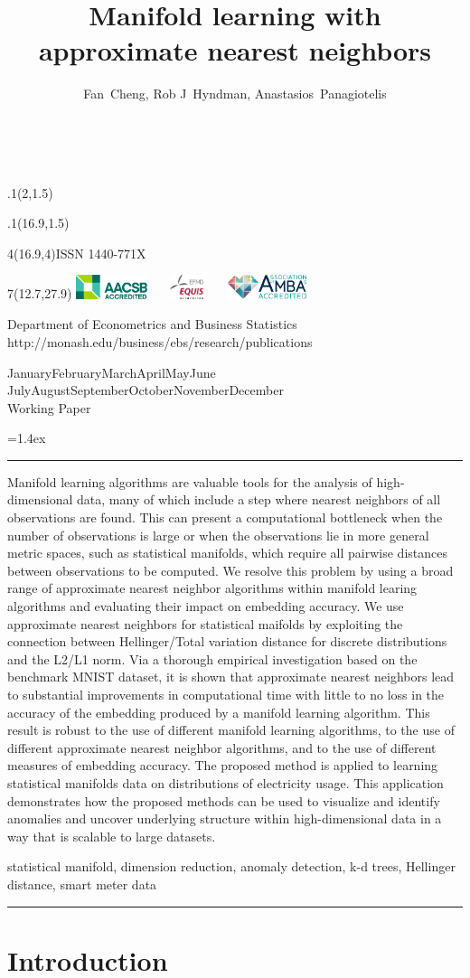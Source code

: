 \documentclass[11pt,a4paper,]{article}
\title{Manifold learning with approximate nearest neighbors}
\author{Fan~Cheng, Rob J~Hyndman, Anastasios~Panagiotelis}
\date{\sf\Date~\Month~\Year}
\makeatletter
\def\Date{\number\day}
\def\Month{\ifcase\month\or
 January\or February\or March\or April\or May\or June\or
 July\or August\or September\or October\or November\or December\fi}
\def\Year{\number\year}
\def\showjel{{\large\textsf{\textbf{JEL classification:}}~\@jel}}
\def\cover{{\sffamily\setcounter{page}{0}
        \thispagestyle{empty}
        \placefig{2}{1.5}{width=5cm}{monash2}
        \placefig{16.9}{1.5}{width=2.1cm}{MBusSchool}
        \begin{textblock}{4}(16.9,4)ISSN 1440-771X\end{textblock}
        \begin{textblock}{7}(12.7,27.9)\hfill
        \includegraphics[height=0.7cm]{AACSB}~~~
        \includegraphics[height=0.7cm]{EQUIS}~~~
        \includegraphics[height=0.7cm]{AMBA}
        \end{textblock}
        \vspace*{2cm}
        \begin{center}\Large
        Department of Econometrics and Business Statistics\\[.5cm]
        \footnotesize http://monash.edu/business/ebs/research/publications
        \end{center}\vspace{2cm}
        \begin{center}
        \fbox{\parbox{14cm}{\begin{onehalfspace}\centering\Huge\vspace*{0.3cm}
                \textsf{\textbf{\expandafter{\@title}}}\vspace{1cm}\par
                \LARGE\@author\end{onehalfspace}
        }}
        \end{center}
        \vfill
                \begin{center}\Large
                \Month~\Year\\[1cm]
                Working Paper \@wp
        \end{center}\vspace*{2cm}}}
\def\pageone{{\sffamily\setstretch{1}%
        \thispagestyle{empty}%
        \vbox to \textheight{%
        \raggedright\baselineskip=1.2cm
     {\fontsize{24.88}{30}\sffamily\textbf{\expandafter{\@title}}}
        \vspace{2cm}\par
        \hspace{1cm}\parbox{14cm}{\sffamily\large\@addresses}\vspace{1cm}\vfill
        \hspace{1cm}{\large\Date~\Month~\Year}\\[1cm]
        \hspace{1cm}\showjel\vss}}}
\def\blindtitle{{\sffamily
     \thispagestyle{plain}\raggedright\baselineskip=1.2cm
     {\fontsize{24.88}{30}\sffamily\textbf{\expandafter{\@title}}}\vspace{1cm}\par
        }}
\def\titlepage{{\cover\newpage\pageone\newpage\blindtitle}}
\let\maketitle\titlepage
\newenvironment{keywords}{\par\vspace{0.5cm}\noindent{\sffamily\textbf{Keywords:}}}{\vspace{0.25cm}\par\hrule\vspace{0.5cm}\par}
\renewenvironment{abstract}{\begin{minipage}{\textwidth}\parskip=1.4ex\noindent
\hrule\vspace{0.1cm}\par{\sffamily\textbf{\abstractname}}\newline}
  {\end{minipage}}
\def\placefig#1#2#3#4{\begin{textblock}{.1}(#1,#2)\rlap{\texttt{[image: \#4]}}\end{textblock}}
\makeatother
\begin{document}
\maketitle
\begin{abstract}
Manifold learning algorithms are valuable tools for the analysis of high-dimensional data, many of which include a step where nearest neighbors of all observations are found. This can present a computational bottleneck when the number of observations is large or when the observations lie in more general metric spaces, such as statistical manifolds, which require all pairwise distances between observations to be computed. We resolve this problem by using a broad range of approximate nearest neighbor algorithms within manifold learing algorithms and evaluating their impact on embedding accuracy. We use approximate nearest neighbors for statistical maifolds by exploiting the connection between Hellinger/Total variation distance for discrete distributions and the L2/L1 norm. Via a thorough empirical investigation based on the benchmark MNIST dataset, it is shown that approximate nearest neighbors lead to substantial improvements in computational time with little to no loss in the accuracy of the embedding produced by a manifold learning algorithm. This result is robust to the use of different manifold learning algorithms, to the use of different approximate nearest neighbor algorithms, and to the use of different measures of embedding accuracy. The proposed method is applied to learning statistical manifolds data on distributions of electricity usage. This application demonstrates how the proposed methods can be used to visualize and identify anomalies and uncover underlying structure within high-dimensional data in a way that is scalable to large datasets.
\end{abstract}
\begin{keywords}
statistical manifold, dimension reduction, anomaly detection, k-d trees, Hellinger distance, smart meter data
\end{keywords}

\newpage

\hypertarget{introduction}{%
\section{Introduction}\label{introduction}}
\end{document}
